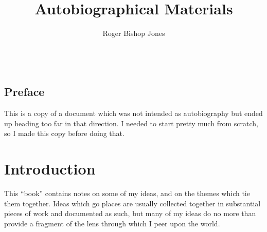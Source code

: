 \title{Autobiographical Materials}
\author{Roger Bishop Jones}
\date{\ }


\frontmatter

\begin{titlepage}
\maketitle

\vfill





%
%
%
%
%

\thispagestyle{empty}
\end{titlepage}

{\parskip=0pt\tableofcontents}


\mainmatter

\section*{Preface}

This is a copy of a document which was not intended as autobiography but ended up heading too far in that direction.
I needed to start pretty much from scratch, so I made this copy before doing that.

\chapter{Introduction}

This ``book'' contains notes on some of my ideas, and on the themes which tie them together.
Ideas which go places are usually collected together in substantial pieces of work and documented as such, but many of my ideas do no more than provide a fragment of the lens through which I peer upon the world.

